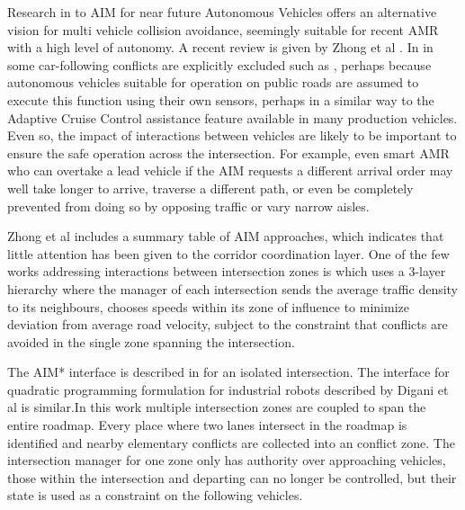 \documentclass[runningheads]{llncs}
\begin{document}
Research in to AIM for near future Autonomous Vehicles offers an alternative vision for multi vehicle collision avoidance, seemingly suitable for recent AMR with a high level of autonomy. A recent review is given by Zhong et al \cite{Zhong2020}. In in some car-following conflicts are explicitly excluded such as \cite{Yao2020}, perhaps because autonomous vehicles suitable for operation on public roads are assumed to execute this function using their own sensors, perhaps in a similar way to the Adaptive Cruise Control assistance feature available in many production vehicles. Even so, the impact of interactions between vehicles are likely to be important to ensure the safe operation across the intersection. For example, even smart AMR who can overtake a lead vehicle if the AIM requests a different arrival order may well take longer to arrive, traverse a different path, or even be completely prevented from doing so by opposing traffic or vary narrow aisles. 

Zhong et al \cite{Zhong2020} includes a summary table of AIM approaches, which indicates that little attention has been given to the corridor coordination layer.  One of the few works addressing interactions between intersection zones is \cite{Du2018} which uses a 3-layer hierarchy where the manager of each intersection sends the average traffic density to its neighbours, chooses speeds within its zone of influence to minimize deviation from average road velocity, subject to the constraint that conflicts are avoided in the single zone spanning the intersection. 

The AIM* interface is described in \cite{Levin2017} for an isolated intersection. The interface for quadratic programming formulation for industrial robots described by Digani et al \cite{Digani2019} is similar.In this work multiple intersection zones are coupled to span the entire roadmap. Every place where two lanes intersect in the roadmap is identified and nearby elementary conflicts are collected into an conflict zone. The intersection manager for one zone only has authority over approaching vehicles, those within the intersection and departing can no longer be controlled, but their state is used as a constraint on the following vehicles. 
\end{document}

